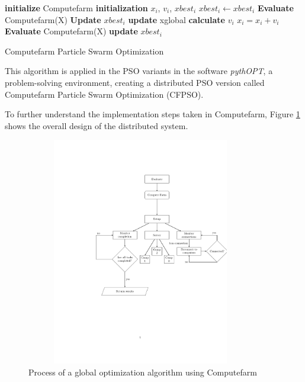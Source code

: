 \begin{algorithm}[H]
  \begin{algorithmic}[2]

      \State \textbf{initialize} Computefarm 
        \State \textbf{initialization} $x_i$, $v_i$, $xbest_i$ 
        $xbest_i \gets xbest_i$
    \EndFor
    \State \textbf{Evaluate} Computefarm(X) 
        \State \textbf{Update} $xbest_i$ 
    \EndFor
            \State \textbf{update} xglobal 
            \State \textbf{calculate} $v_i$ 
            \State $x_i = x_i + v_i$
        \EndFor
        \State \textbf{Evaluate} Computefarm(X)
            \State \textbf{update} $xbest_i$
        \EndFor
    \EndWhile
  \end{algorithmic}
\caption{Computefarm Particle Swarm Optimization}
\label{CFPSO}
\end{algorithm}
 
This algorithm is applied in the PSO variants in the software \textit{pythOPT}, a problem-solving environment, creating a distributed PSO version called Computefarm Particle Swarm Optimization (CFPSO).

To further understand the implementation steps taken in Computefarm, Figure \ref{fig:implementation} shows the overall design of the distributed system. 

\begin{figure}[h!]
    \centering
    \includegraphics[width=10cm,height=10cm]{chapters/chapter_3_Software/flowchart2.pdf}
    \caption{Process of a global optimization algorithm using Computefarm}
    \label{fig:implementation}
\end{figure}

